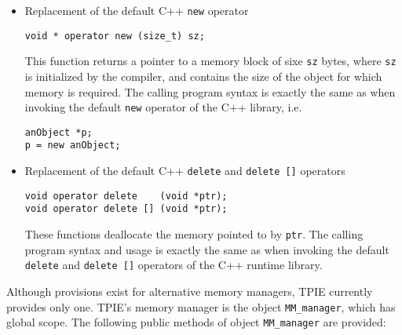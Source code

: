 \begin{itemize}
\item Replacement of the default C++ \verb|new| operator
\begin{verbatim}
void * operator new (size_t) sz;
\end{verbatim}
This function returns a pointer to a memory block of sixe
\verb|sz| bytes, where \verb|sz| is initialized by the
compiler, and contains the size of the object
for which memory is required. The calling program syntax is
exactly the same as when invoking the default \verb|new|
operator of the C++ library, i.e. 

\begin{verbatim}
anObject *p;
p = new anObject; 
\end{verbatim}

\item Replacement of the default C++ \verb|delete| and
\verb|delete []| operators
\begin{verbatim}
void operator delete    (void *ptr);
void operator delete [] (void *ptr);
\end{verbatim}

These functions deallocate the memory pointed to by
\verb|ptr|. The calling program syntax and usage is exactly
the same as when invoking the default \verb|delete| and
\verb|delete []| operators of the C++ runtime library.

\end{itemize}

Although provisions exist for alternative memory managers,
TPIE currently provides only one. TPIE's memory manager is the object
\verb|MM_manager|, which has global scope.  The following
public methods of object \verb|MM_manager| are provided:

